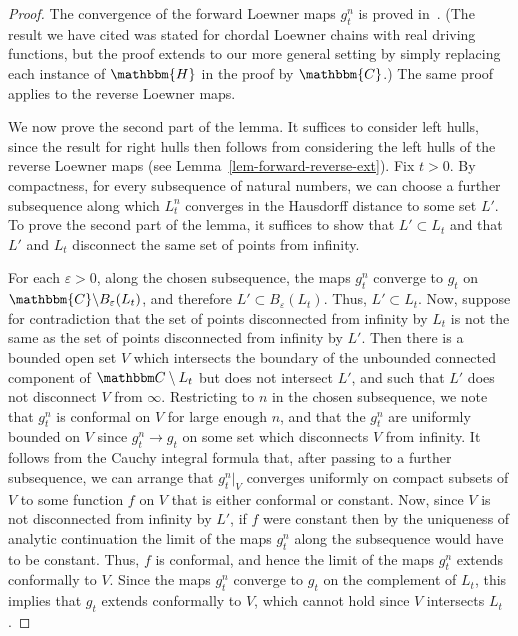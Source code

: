 \documentclass[11pt]{article}
\theoremstyle{plain}
\theoremstyle{definition}
\numberwithin{equation}{section}
\newcommand{\BB}{\mathbbm}
\newcommand{\ep}{\varepsilon}
\begin{document}
\begin{proof}%
The convergence of the forward Loewner maps $g_t^n$ is proved in~\cite[Proposition 4.43]{lawler-book}.  (The result we have cited was stated for chordal Loewner chains with real driving functions, but the proof extends to our more general setting by simply replacing each instance of $\BB{H}$ in the proof by $\BB{C}$.)  The same proof applies to the reverse Loewner maps.

We now prove the second part of the lemma.  It suffices to consider left hulls, since the result for right hulls then follows from considering the left hulls of the reverse Loewner maps (see Lemma~\ref{lem-forward-reverse-ext}). 
Fix $t>0$.
By compactness, for every  subsequence of natural numbers, we can choose a further subsequence along which $L_t^n$ converges in the Hausdorff distance to some set $L'$.  To prove the second part of the lemma, it suffices to show that $L' \subset L_t$  and that  $L'$ and $L_t$ disconnect the same set of points from infinity.  

For each $\ep >0$, along the chosen subsequence, the maps $g_t^n$ converge to $g_t$ on $\BB{C} \backslash B_\ep(L_t)$, and therefore $L' \subset B_\ep(L_t)$. Thus, $L'  \subset L_t$.
Now, suppose for contradiction that the set of points disconnected from infinity by $L_t$ is not the same as the set of points disconnected from infinity by $L'$. Then there is a bounded open set $V$ which intersects the boundary of the unbounded connected component of $\BB C\setminus L_t$ but does not intersect $L'$, and such that $L'$ does not disconnect $V$ from $\infty$. 
Restricting to $n$ in the chosen subsequence, we note that $g_t^n$ is conformal on $V$ for large enough $n$, and that the $g_t^n$ are uniformly bounded on $V$ since $g_t^n \rightarrow g_t$ on some set which disconnects $V$ from infinity. It follows from the Cauchy integral formula that, after passing to a further subsequence, we can arrange that $g_t^n|_V$ converges uniformly on compact subsets of $V$ to some function $f$ on $V$ that is either conformal or constant. Now, since $V$ is not disconnected from infinity by $L'$, if $f$ were constant then by the uniqueness of analytic continuation the limit of the maps $g_t^n$ along the subsequence would have to be constant. Thus, $f$ is conformal, and hence the limit of the maps $g_t^n$ extends conformally to $V$.  Since the maps $g_t^n$ converge to $g_t$ on the complement of $L_t$, this implies that $g_t$ extends conformally to $V$, which cannot hold since $V$ intersects $L_t$.
\end{proof}
\end{document}
